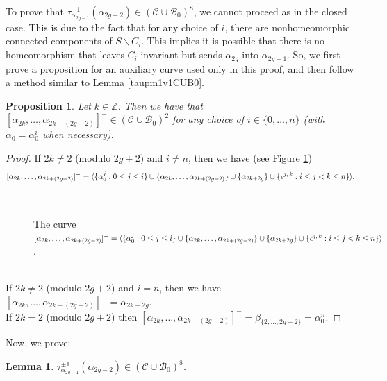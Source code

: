 \documentclass[twoside,11pt,a4paper]{article}
\newtheorem{Lema}[Def]{Lemma}
\newtheorem{Prop}[Def]{Proposition}
\newcommand*{\Cf}{\mathscr{C}}
\newcommand*{\Bf}{\mathscr{B}}
\newcommand*{\eps}[2]{\epsilon^{#1, \hspace{0.05cm} #2}}
\begin{document}
\indent To prove that $\tau_{\alpha_{2g-1}}^{\pm 1}(\alpha_{2g-2}) \in (\Cf \cup \Bf_{0})^{8}$, we cannot proceed as in the closed case. This is due to the fact that for any choice of $i$, there are nonhomeomorphic connected components of $S \backslash C_{i}$. This implies it is possible that there is no homeomorphism that leaves $C_{i}$ invariant but sends $\alpha_{2g}$ into $\alpha_{2g-1}$. So, we first prove a proposition for an auxiliary curve used only in this proof, and then follow a method similar to Lemma \ref{taupm1v1CUB0}.
\begin{Prop}\label{translemaprop3}
 Let $k \in \mathbb{Z}$. Then we have that $[\alpha_{2k}, \ldots, \alpha_{2k + (2g-2)}]^{-} \in (\Cf \cup \Bf_{0})^{2}$ for any choice of $i \in \{0, \ldots, n\}$ (with $\alpha_{0} = \alpha_{0}^{i}$ when necessary).
\end{Prop}
\begin{proof}
 If $2k \neq 2$ (modulo $2g+2$) and $i \neq n$, then we have (see Figure \ref{DefAlpha2kUntilAlpha2kplus2gminus2minusfig1}) $$[\alpha_{2k}, \ldots, \alpha_{2k + (2g-2)}]^{-} = \langle\{\alpha_{0}^{j} : 0 \leq j \leq i\} \cup \{\alpha_{2k}, \ldots, \alpha_{2k+(2g-2)}\} \cup \{\alpha_{2k+2g}\} \cup \{\eps{j}{k} : i \leq j < k \leq n\} \rangle.$$
\begin{figure}[h]
\begin{center}
 \resizebox{10cm}{!}{} \\[0.3cm]
 \resizebox{10cm}{!}{} \caption{The curve $[\alpha_{2k}, \ldots, \alpha_{2k + (2g-2)}]^{-} = \langle\{\alpha_{0}^{j} : 0 \leq j \leq i\} \cup \{\alpha_{2k}, \ldots, \alpha_{2k+(2g-2)}\} \cup \{\alpha_{2k+2g}\} \cup \{\eps{j}{k} : i \leq j < k \leq n\} \rangle$.} \label{DefAlpha2kUntilAlpha2kplus2gminus2minusfig1}
\end{center}
\end{figure}\\
 \indent If $2k \neq 2$ (modulo $2g+2$) and $i = n$, then we have $[\alpha_{2k}, \ldots, \alpha_{2k + (2g-2)}]^{-} = \alpha_{2k +2g}$.\\
 \indent If $2k = 2$ (modulo $2g+2$) then $[\alpha_{2k}, \ldots, \alpha_{2k + (2g-2)}]^{-} = \beta_{\{2, \ldots, 2g-2\}}^{-} = \alpha_{0}^{n}$.
\end{proof}
\vspace{0.5cm}
\indent Now, we prove:
\begin{Lema}\label{taupm1v2CUB0}
 $\tau_{\alpha_{2g-1}}^{\pm 1}(\alpha_{2g-2}) \in (\Cf \cup \Bf_{0})^{8}$.
\end{Lema}
\end{document}

